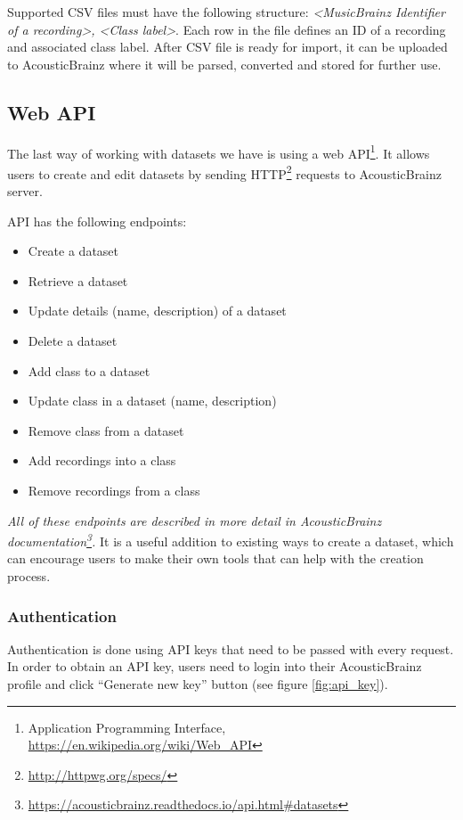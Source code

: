 Supported CSV files must have the following structure: \textit{\textless MusicBrainz Identifier of a recording\textgreater, \textless Class label\textgreater}. Each row in the file defines an ID of a recording and associated class label. After CSV file is ready for import, it can be uploaded to AcousticBrainz where it will be parsed, converted and stored for further use.

\subsection{Web API}

The last way of working with datasets we have is using a web API\footnote{Application Programming Interface, \url{https://en.wikipedia.org/wiki/Web_API}}. It allows users to create and edit datasets by sending HTTP\footnote{\url{http://httpwg.org/specs/}} requests to AcousticBrainz server.

API has the following endpoints:
\begin{itemize}
    \item Create a dataset
    \item Retrieve a dataset
    \item Update details (name, description) of a dataset
    \item Delete a dataset
    \item Add class to a dataset
    \item Update class in a dataset (name, description)
    \item Remove class from a dataset
    \item Add recordings into a class
    \item Remove recordings from a class
\end{itemize}

\textit{All of these endpoints are described in more detail in AcousticBrainz documentation\footnote{\url{https://acousticbrainz.readthedocs.io/api.html\#datasets}}.} It is a useful addition to existing ways to create a dataset, which can encourage users to make their own tools that can help with the creation process.

\subsubsection{Authentication}

Authentication is done using API keys that need to be passed with every request. In order to obtain an API key, users need to login into their AcousticBrainz profile and click ``Generate new key'' button (see figure \ref{fig:api_key}).

